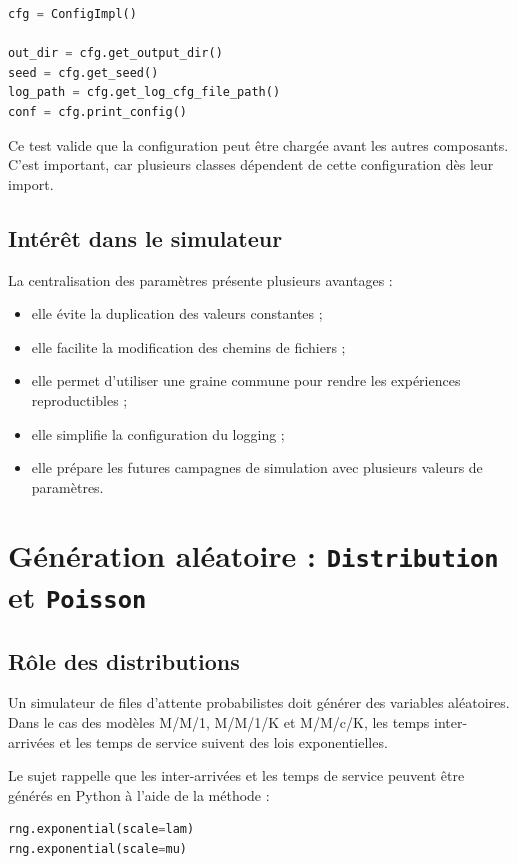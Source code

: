 \documentclass{article}
\begin{document}
\begin{lstlisting}[language=Python, caption=Principe du test de ConfigImpl]
cfg = ConfigImpl()

out_dir = cfg.get_output_dir()
seed = cfg.get_seed()
log_path = cfg.get_log_cfg_file_path()
conf = cfg.print_config()
\end{lstlisting}

Ce test valide que la configuration peut être chargée avant les autres composants. C’est important, car plusieurs classes dépendent de cette configuration dès leur import.

\subsection{Intérêt dans le simulateur}

La centralisation des paramètres présente plusieurs avantages :
\begin{itemize}[leftmargin=*]
    \item elle évite la duplication des valeurs constantes ;
    \item elle facilite la modification des chemins de fichiers ;
    \item elle permet d’utiliser une graine commune pour rendre les expériences reproductibles ;
    \item elle simplifie la configuration du logging ;
    \item elle prépare les futures campagnes de simulation avec plusieurs valeurs de paramètres.
\end{itemize}

\section{Génération aléatoire : \texttt{Distribution} et \texttt{Poisson}}

\subsection{Rôle des distributions}

Un simulateur de files d’attente probabilistes doit générer des variables aléatoires. Dans le cas des modèles M/M/1, M/M/1/K et M/M/c/K, les temps inter-arrivées et les temps de service suivent des lois exponentielles.

Le sujet rappelle que les inter-arrivées et les temps de service peuvent être générés en Python à l’aide de la méthode :

\begin{lstlisting}[language=Python, caption=Génération exponentielle avec NumPy]
rng.exponential(scale=lam)
rng.exponential(scale=mu)
\end{lstlisting}
\end{document}
